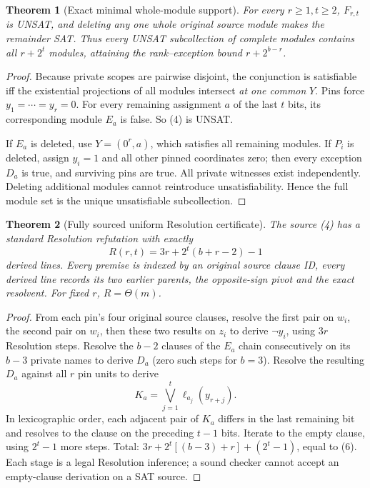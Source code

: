 \documentclass[11pt]{article}
\newtheorem{theorem}{Theorem}
\begin{document}
\begin{theorem}[Exact minimal whole-module support]
For every $r\ge1,t\ge2$, $F_{r,t}$ is UNSAT,
and deleting any one whole original source module makes
the remainder SAT. Thus every UNSAT subcollection of
complete modules contains all $r+2^t$ modules, attaining
the rank--exception bound $r+2^{b-r}$.
\end{theorem}
\begin{proof}
Because private scopes are pairwise disjoint,
the conjunction is satisfiable iff the existential
projections of all modules intersect \emph{at one common}
$Y$. Pins force $y_1=\cdots=y_r=0$.
For every remaining assignment $a$ of the last $t$
bits, its corresponding module $E_a$ is false.
So (4) is UNSAT.

If $E_a$ is deleted, use $Y=(0^r,a)$, which satisfies
all remaining modules. If $P_i$ is deleted, assign
$y_i=1$ and all other pinned coordinates zero;
then every exception $D_a$ is true, and surviving
pins are true. All private witnesses exist independently.
Deleting additional modules cannot reintroduce
unsatisfiability. Hence the full module set is the unique
unsatisfiable subcollection.
\end{proof}

\begin{theorem}[Fully sourced uniform Resolution certificate]
The source (4) has a standard Resolution refutation
with exactly
\[
\boxed{R(r,t)=3r+2^t(b+r-2)-1}                  \tag{6}
\]
derived lines. Every premise is indexed by an original
source clause ID, every derived line records its two
earlier parents, the opposite-sign pivot and the exact
resolvent. For fixed $r$, $R=\Theta(m)$.
\end{theorem}
\begin{proof}
From each pin's four original source clauses,
resolve the first pair on $w_i$, the second pair on
$w_i$, then these two results on $z_i$ to derive
$\neg y_i$, using $3r$ Resolution steps.
Resolve the $b-2$ clauses of the $E_a$ chain
consecutively on its $b-3$ private names to derive
$D_a$ (zero such steps for $b=3$).
Resolve the resulting $D_a$ against all $r$ pin
units to derive
\[
K_a=\bigvee_{j=1}^t\ell_{a_j}(y_{r+j}).         \tag{7}
\]
In lexicographic order, each adjacent pair of
$K_a$ differs in the last remaining bit and resolves
to the clause on the preceding $t-1$ bits.
Iterate to the empty clause, using $2^t-1$
more steps. Total:
$3r+2^t[(b-3)+r]+(2^t-1)$, equal to (6).
Each stage is a legal Resolution inference; a
sound checker cannot accept an empty-clause
derivation on a SAT source.
\end{proof}
\end{document}
